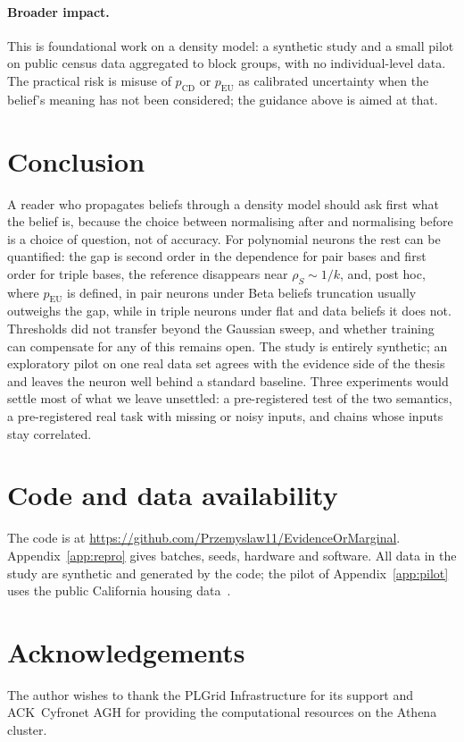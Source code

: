 \documentclass[10pt,a4paper]{article}
\newcommand{\pcd}{p_{\mathrm{CD}}}
\newcommand{\peu}{p_{\mathrm{EU}}}
\newcommand{\rs}{\rho_S}
\theoremstyle{upright}
\begin{document}
\paragraph{Broader impact.} This is foundational work on a density model: a synthetic study and a small pilot on public census data aggregated to block groups, with no individual-level data. The practical risk is misuse of $\pcd$ or $\peu$ as calibrated uncertainty when the belief's meaning has not been considered; the guidance above is aimed at that.

\section{Conclusion}

A reader who propagates beliefs through a density model should ask first what the belief is, because the choice between normalising after and normalising before is a choice of question, not of accuracy. For polynomial neurons the rest can be quantified: the gap is second order in the dependence for pair bases and first order for triple bases, the reference disappears near $\rs\sim1/k$, and, post hoc, where $\peu$ is defined, in pair neurons under Beta beliefs truncation usually outweighs the gap, while in triple neurons under flat and data beliefs it does not. Thresholds did not transfer beyond the Gaussian sweep, and whether training can compensate for any of this remains open. The study is entirely synthetic; an exploratory pilot on one real data set agrees with the evidence side of the thesis and leaves the neuron well behind a standard baseline. Three experiments would settle most of what we leave unsettled: a pre-registered test of the two semantics, a pre-registered real task with missing or noisy inputs, and chains whose inputs stay correlated. %

\section*{Code and data availability}
The code is at \url{https://github.com/Przemyslaw11/EvidenceOrMarginal}. Appendix~\ref{app:repro} gives batches, seeds, hardware and software. All data in the study are synthetic and generated by the code; the pilot of Appendix~\ref{app:pilot} uses the public California housing data~\citep{pace1997sparse}.

\section*{Acknowledgements}
The author wishes to thank the PLGrid Infrastructure for its support and ACK~Cyfronet AGH for providing the computational resources on the Athena cluster.
\end{document}
